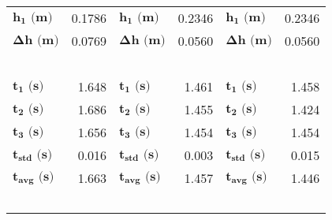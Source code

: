 \begin{landscape}
\begin{table}
{\begin{tabular}{lr|lr|lr}
$\mathbf{h_1\textbf{ (m)}}$                                  & 0.1786                 & $\mathbf{h_1\textbf{ (m)}}$                                  & 0.2346                 & $\mathbf{h_1\textbf{ (m)}}$                                  & 0.2346                 \\
$\mathbf{\Delta{h}\textbf{ (m)}}$                             & 0.0769                 & $\mathbf{\Delta{h}\textbf{ (m)}}$                             & 0.0560                 & $\mathbf{\Delta{h}\textbf{ (m)}}$                             & 0.0560                 \\
                                                             & \multicolumn{1}{l|}{~} & ~                                                            & \multicolumn{1}{l|}{~} &                                                              & \multicolumn{1}{l}{}   \\
$\mathbf{t_1\textbf{ (s)}}$                                  & 1.648                  & $\mathbf{t_1\textbf{ (s)}}$                                  & 1.461                  & $\mathbf{t_1\textbf{ (s)}}$                                  & 1.458                  \\
$\mathbf{t_2\textbf{ (s)}}$                                  & 1.686                  & $\mathbf{t_2\textbf{ (s)}}$                                  & 1.455                  & $\mathbf{t_2\textbf{ (s)}}$                                  & 1.424                  \\
$\mathbf{t_3\textbf{ (s)}}$                                  & 1.656                  & $\mathbf{t_3\textbf{ (s)}}$                                  & 1.454                  & $\mathbf{t_3\textbf{ (s)}}$                                  & 1.454                  \\
$\mathbf{t_\textbf{std} \textbf{ (s)}}$                      & 0.016                  & $\mathbf{t_\textbf{std} \textbf{ (s)}}$                      & 0.003                  & $\mathbf{t_\textbf{std} \textbf{ (s)}}$                      & 0.015                  \\
$\mathbf{t_\textbf{avg} \textbf{ (s)}}$                      & 1.663                  & $\mathbf{t_\textbf{avg} \textbf{ (s)}}$                      & 1.457                  & $\mathbf{t_\textbf{avg} \textbf{ (s)}}$                      & 1.446                  \\
                                                             & \multicolumn{1}{l|}{~} & ~                                                            & \multicolumn{1}{l|}{~} &                                                              & \multicolumn{1}{l}{}   \\

\end{tabular}}
\end{table}
\end{landscape}
